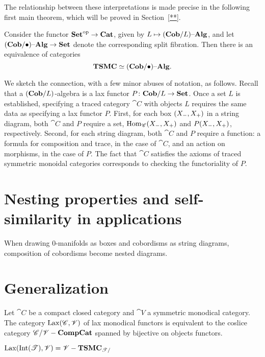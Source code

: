 The relationship between these interpretations is made precise in the following first main theorem, which will be proved in Section~\ref{**}.
\begin{theorem}
Consider the functor ${\mathbf{Set}}^{\text{op}}\to\mathbf{Cat}$, given by $L\mapsto(\mathbf{Cob}/L){\text \textendash}\mathbf{Alg}$, and let $(\mathbf{Cob}/\bullet){\text \textendash}\mathbf{Alg}\to\mathbf{Set}$ denote the corresponding split fibration. Then there is an equivalence of categories
$$\mathbf{TSMC}\simeq(\mathbf{Cob}/\bullet){\text \textendash}\mathbf{Alg}.$$
\end{theorem}

We sketch the connection, with a few minor abuses of notation, as follows. Recall that a $(\mathbf{Cob}/L)$-algebra is a lax functor $P\colon\mathbf{Cob}/L\to\mathbf{Set}$. Once a set $L$ is established, specifying a traced category $\cat{C}$ with objects $L$ requires the same data as specifying a lax functor $P$. First, for each box $({X_-},{X_+})$ in a string diagram, both $\cat{C}$ and $P$ require a set, $\operatorname{Hom}_{\mathscr{C}}({X_-},{X_+})$ and $P({X_-},{X_+})$, respectively.  Second, for each string diagram, both $\cat{C}$ and $P$ require a function: a formula for composition and trace, in the case of $\cat{C}$, and an action on morphisms, in the case of $P$. The fact that $\cat{C}$ satisfies the axioms of traced symmetric monoidal categories corresponds to checking the functoriality of $P$.

\section{Nesting properties and self-similarity in applications}

When drawing 0-manifolds as boxes and cobordisms as string diagrams, composition of cobordisms become nested diagrams.



\section{Generalization}

\begin{theorem}
 Let $\cat{C}$ be a compact closed category and $\cat{V}$ a symmetric monodical category.  The category $\operatorname{Lax}(\mathscr{C},\mathscr{V})$ of lax monodical functors is equivalent to the coslice category $\mathscr{C}/\mathscr{V}-\mathbf{CompCat}$ spanned by bijective on objects functors.
\end{theorem}
\begin{corollary}
 $\operatorname{Lax}(\operatorname{Int}(\mathscr{T}),\mathscr{V})=\mathscr{V}-\mathbf{TSMC}_{\mathscr{T}/}$
\end{corollary}

